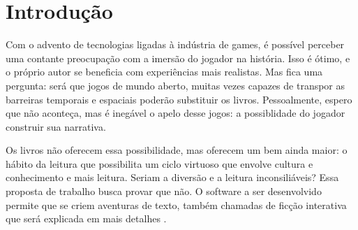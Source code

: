 \chapter{Introdução}
\label{cap:introducao}

Com o advento de tecnologias  ligadas à indústria de games, é possível perceber uma contante
preocupação com a imersão do jogador na história. Isso é ótimo, e o próprio autor se beneficia
com experiências mais realistas. Mas fica uma pergunta: será que jogos de mundo aberto, muitas
vezes capazes de transpor as barreiras temporais e espaciais poderão substituir os livros.
Pessoalmente, espero que não aconteça, mas é inegável o apelo desse jogos: a possiblidade do
jogador construir sua narrativa.

Os livros não oferecem essa possibilidade, mas oferecem um bem ainda maior: o hábito da leitura que
possibilita um ciclo virtuoso que envolve cultura e conhecimento e mais leitura. Seriam a diversão
e a leitura inconsiliáveis? Essa proposta de trabalho busca provar que não. O software a ser desenvolvido
permite que se criem aventuras de texto, também chamadas de ficção interativa que será explicada em mais detalhes .
%
%
%
%
%
%
%
